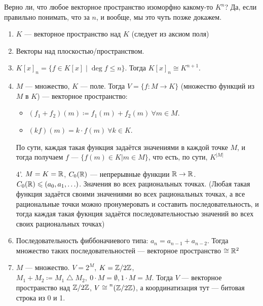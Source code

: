 Верно ли, что любое векторное пространство изоморфно какому-то $K^n$? Да, если правильно понимать, что за $n$, и вообще, мы это чуть позже докажем.

\begin{example}
\slashn
\begin{enumerate}
	\item $K$ --- векторное пространство над $K$ (следует из аксиом поля)
     \item Векторы над плоскостью/пространством.
     \item $K\left[x\right]_n = \{ f \in K[x] \mid \deg f \le n \}$. Тогда $K[x]_n \cong K^{n+1}$. 
     \item $M$ --- множество,  $K$ --- поле. Тогда  $V = \{ f\!: M \to K\}$ (множество функций из $M$ в $K$) --- векторное пространство:
         \begin{itemize}
            \item $(f_1 + f_2)(m) \coloneqq f_1(m) + f_2(m)\ \forall m \in M$.
            \item $(kf)(m) = k \cdot f(m)\ \forall k \in K$.
         \end{itemize}

	 По сути, каждая такая функция задаётся значениями в каждой точке $M$, и тогда получаем $f$ --- $\{ f(m) \in K | m \in M\}$, что есть, по сути, $K^{|M|}$
 \item[4'.] $M=K=\mathbb{R}$,  $C_0(\mathbb{R})$ --- непрерывные функции  $\mathbb{R} \to \mathbb{R}$.  $C_0(\mathbb{R}) \leqslant (a_0, a_1, \ldots)$. Значения во всех рациональных точках. (Любая такая функция задаётся своими значениями во всех рациональных точках, а все рациональные точки можно пронумеровать и составить последовательность, и тогда каждая такая фукнция задаётся последовательностью значений во всех своих рациональных точках)
     \item Последовательность фиббоначиевого типа: $a_n = a_{n-1} + a_{n-2}$. Тогда множество таких последовательностей --- векторное пространство  $\cong \mathbb{R}^2$
     \item $M$ --- множество.  $V = 2^M$,  $K = \mathbb{Z} / 2 \mathbb{Z}$, $M_1 + M_2 \coloneqq M_1 \bigtriangleup M_2,\ 0 \cdot M = \emptyset, 1 \cdot M = M$. Тогда $V$ --- векторное пространство над  $\mathbb{Z} / 2 \mathbb{Z}$,  $V \cong \prescript{n}{}{(\Z / 2 \Z)}$, а координатизация тут --- битовая строка из 0 и 1.
\end{enumerate}
\end{example}


